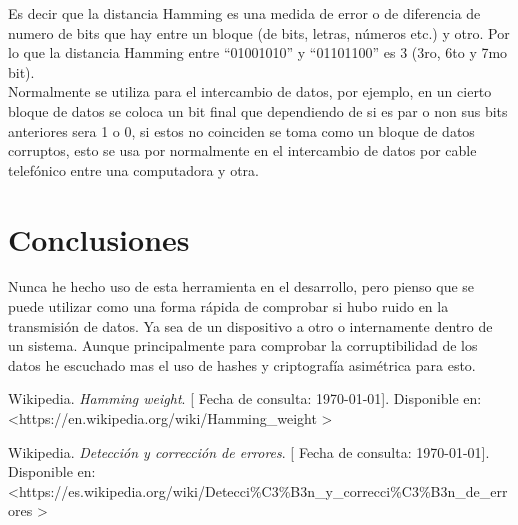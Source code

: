 \documentclass[spanish,12pt,letterpapper]{article}
\begin{document}
	Es decir que la distancia Hamming es una medida de error o de diferencia de numero de bits que hay entre un bloque (de bits, letras, números etc.) y otro. Por lo que la distancia Hamming entre ``01001010'' y ``01101100'' es 3 (3ro, 6to y 7mo bit).\\
	
	Normalmente se utiliza para el intercambio de datos, por ejemplo, en un cierto bloque de datos se coloca un bit final que dependiendo de si es par o non sus bits anteriores sera 1 o 0, si estos no coinciden se toma como un bloque de datos corruptos, esto se usa por normalmente en el intercambio de datos por cable telefónico entre una computadora y otra.
	
	\section{Conclusiones \\}
	Nunca he hecho uso de esta herramienta en el desarrollo, pero pienso que se puede utilizar como una forma rápida de comprobar si hubo ruido en la transmisión de datos. Ya sea de un dispositivo a otro o internamente dentro de un sistema. Aunque principalmente para comprobar la corruptibilidad de los datos he escuchado mas el uso de hashes y criptografía asimétrica para esto.
	
	\pagebreak
	
	\begin{thebibliography}{9}
		 Wikipedia. 
		\emph{Hamming weight}.  {[} Fecha de consulta: \today {]}. Disponible en: \textless https://en.wikipedia.org/wiki/Hamming\_weight \textgreater
		
		 Wikipedia. 
		\emph{Detección y corrección de errores}.  {[} Fecha de consulta: \today {]}. Disponible en: \textless https://es.wikipedia.org/wiki/Detecci\%C3\%B3n\_y\_correcci\%C3\%B3n\_de\_errores \textgreater
	\end{thebibliography}
	
\end{document}
